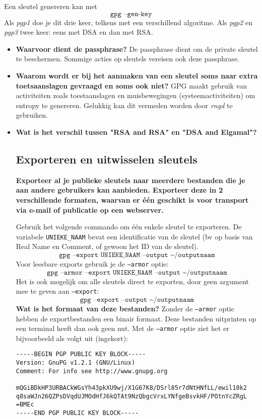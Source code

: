 \documentclass{report}
\begin{document}
	Een sleutel genereren kan met 
	$$\texttt{gpg --gen-key}$$
	Als \textit{pgp1} doe je dit drie keer, telkens met een verschillend algoritme. Als \textit{pgp2} en \textit{pgp3} twee keer: eens met DSA en dan met RSA. 
\begin{itemize}
	\item \textbf{Waarvoor dient de passphrase?} De passphrase dient om de private sleutel te beschermen. Sommige acties op sleutels vereisen ook deze passphrase.
	\item \textbf{Waarom wordt er bij het aanmaken van een sleutel soms naar extra toetsaanslagen gevraagd en soms ook niet?} GPG maakt gebruik van activiteiten zoals toestaanslagen en muisbewegingen (systeemactiviteiten) om entropy te genereren. Gelukkig kan dit vermeden worden door \textit{rngd} te gebruiken.
	\item \textbf{Wat is het verschil tussen "RSA and RSA" en "DSA and Elgamal"?}
\subsection{Exporteren en uitwisselen sleutels}
\textbf{Exporteer al je publieke sleutels naar meerdere bestanden die je aan andere gebruikers kan aanbieden. Exporteer deze in 2 verschillende formaten, waarvan er één geschikt is voor transport via e-mail of publicatie op een webserver.}

Gebruik het volgende commando om één enkele sleutel te exporteren. De variabele \texttt{UNIEKE\_NAAM} bevat een identificatie van de sleutel (bv op basis van Real Name en Comment, of gewoon het ID van de sleutel). 
$$\texttt{gpg --export UNIEKE\_NAAM --output \textasciitilde/outputnaam}$$
Voor leesbare exports gebruik je de \texttt{--armor} optie:
$$\texttt{gpg --armor --export UNIEKE\_NAAM --output \textasciitilde/outputnaam}$$
Het is ook mogelijk om alle sleutels direct te exporten, door geen argument mee te geven aan \texttt{--export}:
$$\texttt{gpg --export --output \textasciitilde/outputnaam}$$
\textbf{Wat is het formaat van deze bestanden?} Zonder de \texttt{--armor} optie hebben de exportbestanden een binair formaat. Deze bestanden uitprinten op een terminal heeft dan ook geen nut. Met de \texttt{--armor} optie ziet het er bijvoorbeeld als volgt uit (ingekort):
\begin{lstlisting}
-----BEGIN PGP PUBLIC KEY BLOCK-----
Version: GnuPG v1.2.1 (GNU/Linux)
Comment: For info see http://www.gnupg.org

mQGiBDkHP3URBACkWGsYh43pkXU9wj/X1G67K8/DSrl85r7dNtHNfLL/ewil10k2
q8saWJn26QZPsDVqdUJMOdHfJ6kQTAt9NzQbgcVrxLYNfgeBsvkHF/POtnYcZRgL
=BMEc
-----END PGP PUBLIC KEY BLOCK-----
\end{lstlisting}


\end{itemize}
\end{document}
